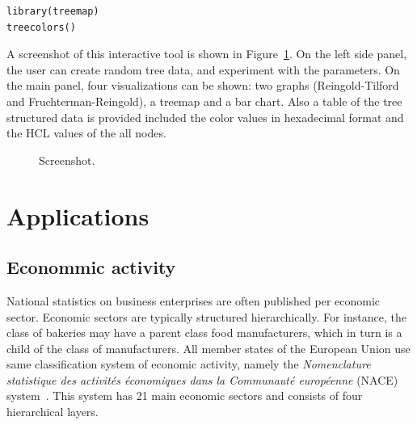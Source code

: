 \documentclass[journal]{vgtc}                %
\begin{document}
\begin{verbatim}
library(treemap)
treecolors()
\end{verbatim}

A screenshot of this interactive tool is shown in Figure~\ref{fig:screen}. On the left side panel, the user can create random tree data, and experiment with the parameters. On the main panel, four visualizations can be shown: two graphs (Reingold-Tilford and Fruchterman-Reingold), a treemap and a bar chart. Also a table of the tree structured data is provided included the color values in hexadecimal format and the HCL values of the all nodes.

\begin{figure}[tb]
  \centering
  \caption{Screenshot.}\label{fig:screen}
\end{figure}



\section{Applications}\label{secapplication}

\subsection{Econommic activity}

National statistics on business enterprises are often published per economic sector. Economic sectors are typically structured hierarchically. For instance, the class of bakeries may have a parent class food manufacturers, which in turn is a child of the class of manufacturers. All member states of the European Union use same classification system of economic activity, namely the \textit{Nomenclature statistique des activit\'es \'economiques dans la Communaut\'e europ\'eenne} (NACE) system~\cite{nace}. This system has 21 main economic sectors and consists of four hierarchical layers.
\end{document}
